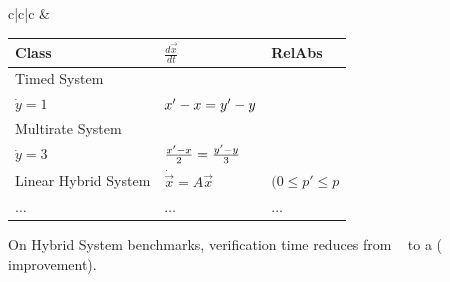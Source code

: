 \documentclass{seminar}
\begin{document}
\begin{slide}
\begin{tabular}{c|c|c}
&
\begin{minipage}{1.4in}
\small{
\begin{tabular}{|p{0.34in}|p{0.33in}|p{0.33in}|}
\hline
Class & $\frac{d\vec{x}}{dt}$ & RelAbs
\\
\hline \hline
\parbox{0.34in}{Timed System} & 
\parbox{0.34in}{$\dot{x}=1$,\\$\dot{y} = 1$} & 
\parbox{0.45in}{$x'-x=\\y'-y$}
\\
\hline
\parbox{0.34in}{Multirate System} & 
\parbox{0.34in}{$\dot{x}=2$,\\$\dot{y}=3$} & 
\parbox{0.33in}{$\frac{x'-x}{2} = \\ \frac{y'-y}{3}$}
\\
\hline
\parbox{0.34in}{Linear Hybrid System} & 
\parbox{0.36in}{$\dot{\vec{x}} = A\vec{x}$} & 
\parbox{0.33in}{$(0 \leq p'\leq p$}
\\
\hline
$\ldots$ & $\ldots$ & $\ldots$
\\
\hline
\end{tabular}

\bigskip

On Hybrid System benchmarks, verification time reduces from
~{} to a {} ({} improvement).
}
\end{minipage}
\end{tabular}

\end{slide}
\end{document}
